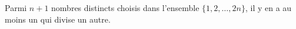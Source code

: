 Parmi $n + 1$ nombres distincts choisis dans l'ensemble $\{1, 2, \ldots, 2n\}$, il y en
a au moins un qui divise un autre.
